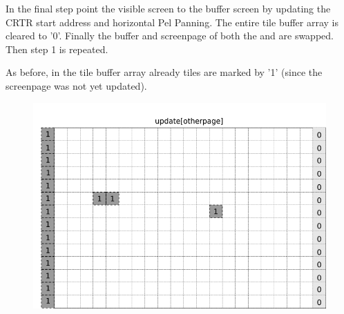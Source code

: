 \documentclass[book.tex]{subfiles}
\begin{document}
\begin{minipage}{.4\textwidth}
In the final step point the visible screen to the buffer screen by updating the CRTR start address and horizontal Pel Panning. The entire tile buffer array is cleared to '0'. Finally the buffer and screenpage of both the  and  are swapped. Then step 1 is repeated. \\
\par
As before, in the tile buffer array already tiles are marked by '1' (since the screenpage was not yet updated).
 \end{minipage}
\begin{minipage}{.6\textwidth}
\begin{figure}[H]
  \centering
 \includegraphics[width=.9\textwidth]{screenshots_300dpi/game/Scroll_KC4_6_1-scroll_update_final.png}
 \label{fig:kc4-6_update_final_img_1}  
\end{figure}
\end{minipage}\\
\end{document}
